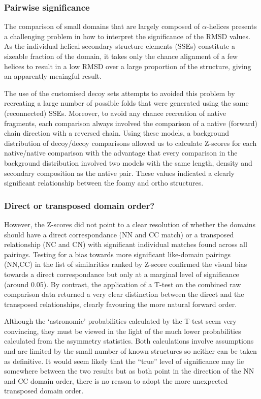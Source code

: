 \documentclass[preprint,12pt]{elsarticle}
\newcommand{\A}{$\alpha$}
\begin{document}
\subsubsection{Pairwise significance}

The comparison of small domains that are largely composed of \A-helices presents a challenging problem in how
to interpret the significance of the RMSD values.  As the individual helical secondary structure elements
(SSEs) constitute a sizeable fraction of the domain, it takes only the chance alignment of a few helices
to result in a low RMSD over a large proportion of the structure, giving an apparently meaingful result.

The use of
the customised decoy sets attempts to avoided this problem by recreating a large number of possible folds
that were generated using the same (reconnected) SSEs.   Moreover, to avoid any chance recreation of native fragments,
each comparison always involved the comparison of a native (forward) chain direction with a reversed chain.
Using these models, a background distribution of decoy/decoy comparisons allowed us to calculate Z-scores
for each native/native comparison with the advantage that every comparison in the background distribution
involved two models with the same length, density and secondary composition as the native pair.
These values indicated a clearly significant relationship between the foamy and ortho structures.

\subsubsection{Direct or transposed domain order?}

However, the Z-scores did not point to a clear resolution of whether the domains should have a direct
correspondance (NN and CC match) or a transposed relationship (NC and CN) with significant individual
matches found across all pairings.  Testing for a bias towards more significant like-domain pairings (NN,CC)
in the list of similarities ranked by Z-score confirmed the visual bias towards a direct correspondance
but only at a marginal level of significance (around 0.05).  By contrast, the application of a T-test on the
combined raw comparison data returned a very clear distinction between the direct and the transposed
relationships, clearly favouring the more natural forward order.

Although the `astronomic' probabilities calculated by the T-test seem very convincing, they
must be viewed in the light of the much lower probabilities calculated from the asymmetry
statistics.   Both calculations involve assumptions and are limited by the small number of known
structures so neither can be taken as definitive.    It would seem likely that the ``true'' level of
significance may lie somewhere between the two results but as both point in the direction of the NN and CC
domain order, there is no reason to adopt the more unexpected transposed domain order.
\end{document}
